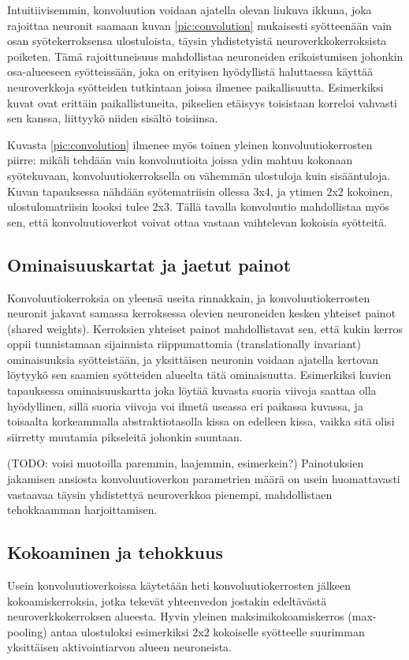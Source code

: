 \documentclass[finnish]{tktltiki2}
\theoremstyle{definition}
\theoremstyle{remark}
\begin{document}
    Intuitiivisemmin, konvoluution voidaan ajatella olevan liukuva ikkuna, joka rajoittaa neuronit saamaan kuvan \ref{pic:convolution} mukaisesti syötteenään vain osan syötekerroksensa ulostuloista, täysin yhdistetyistä neuroverkkokerroksista poiketen. Tämä rajoittuneisuus mahdollistaa neuroneiden erikoistumisen johonkin osa-alueeseen syötteissään, joka on erityisen hyödyllistä haluttaessa käyttää neuroverkkoja syötteiden tutkintaan joissa ilmenee paikallisuutta. Esimerkiksi kuvat ovat erittäin paikallistuneita, pikselien etäisyys toisistaan korreloi vahvasti sen kanssa, liittyykö niiden sisältö toisiinsa.

    Kuvasta \ref{pic:convolution} ilmenee myös toinen yleinen konvoluutiokerrosten piirre: mikäli tehdään vain konvoluutioita joissa ydin mahtuu kokonaan syötekuvaan, konvoluutiokerroksella on vähemmän ulostuloja kuin sisääntuloja. Kuvan tapauksessa nähdään syötematriisin ollessa 3x4, ja ytimen 2x2 kokoinen, ulostulomatriisin kooksi tulee 2x3. Tällä tavalla konvoluutio mahdollistaa myös sen, että konvoluutioverkot voivat ottaa vastaan vaihtelevan kokoisia syötteitä.

    \subsection{Ominaisuuskartat ja jaetut painot}

    Konvoluutiokerroksia on yleensä useita rinnakkain, ja konvoluutiokerrosten neuronit jakavat samassa kerroksessa olevien neuroneiden kesken yhteiset painot (shared weights). Kerroksien yhteiset painot mahdollistavat sen, että kukin kerros oppii tunnistamaan sijainnista riippumattomia (translationally invariant) ominaisuuksia syötteistään, ja yksittäisen neuronin voidaan ajatella kertovan löytyykö sen saamien syötteiden alueelta tätä ominaisuutta. Esimerkiksi kuvien tapauksessa ominaisuuskartta joka löytää kuvasta suoria viivoja saattaa olla hyödyllinen, sillä suoria viivoja voi ilmetä useassa eri paikassa kuvassa, ja toisaalta korkeammalla abstraktiotasolla kissa on edelleen kissa, vaikka sitä olisi siirretty muutamia pikseleitä johonkin suuntaan.

    (TODO: voisi muotoilla paremmin, laajemmin, esimerkein?) Painotuksien jakamisen ansiosta konvoluutioverkon parametrien määrä on usein huomattavasti vastaavaa täysin yhdistettyä neuroverkkoa pienempi, mahdollistaen tehokkaamman harjoittamisen.
    \subsection{Kokoaminen ja tehokkuus}
    Usein konvoluutioverkoissa käytetään heti konvoluutiokerrosten jälkeen kokoamiskerroksia, jotka tekevät yhteenvedon jostakin edeltävästä neuroverkkokerroksen alueesta. Hyvin yleinen maksimikokoamiskerros (max-pooling) antaa ulostuloksi esimerkiksi 2x2 kokoiselle syötteelle suurimman yksittäisen aktivointiarvon alueen neuroneista.
\end{document}
